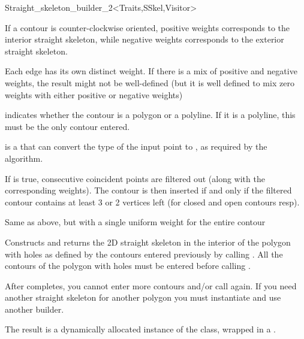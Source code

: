 \begin{ccRefClass}{Straight_skeleton_builder_2<Traits,SSkel,Visitor>}
{If a contour is counter-clockwise oriented, positive weights corresponds to the interior straight skeleton, while negative weights corresponds to the exterior straight skeleton.

Each edge has its own distinct weight. If there is a mix of positive and negative weights, the result might not be well-defined (but it is well defined to mix zero weights with either positive or negative weights)

 indicates whether the contour is a polygon or a polyline. If it is a polyline, this must be the only contour entered.

 is a  that can convert the type of the input point to , as required by the algorithm.

If  is true, consecutive coincident points are filtered out (along with the corresponding weights). The contour is then inserted if and only if the filtered contour contains at least 3 or 2 vertices left (for closed and open contours resp).
 

}
\ccGlue
{}
{Same as above, but with a single uniform weight for the entire contour}

\ccGlue
{}
{Constructs and returns the 2D straight skeleton in the interior of the polygon with holes as defined by the contours entered previously by calling . All the contours of the polygon with holes must be entered before calling .

After  completes, you cannot enter more contours and/or call  again. If you need another straight skeleton for another polygon you must instantiate and use another builder.

The result is a dynamically allocated instance of the  class, wrapped in a .

}
\end{ccRefClass}

